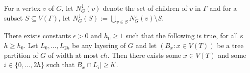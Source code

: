 \documentclass{patmorin}
\begin{document}
For a vertex $v$ of $G$, let $N^\downarrow_{G}(v)$ denote the set of children of $v$ in $\Gamma$ and for a subset $S\subseteq V(\Gamma)$, let $N^\downarrow_G(S):=\bigcup_{v\in S}N^\downarrow_G(v)\setminus S$.






\begin{lem}
  There exists constants $\epsilon >0$ and $h_0\ge 1$ such that the following is true, for all s $h \ge h_0$.  Let $L_0,\ldots,L_{2h}$ be any layering of $G$ and let $(B_x:x\in V(T))$ be a tree partition of $G$ of width at most $ch$.  Then there exists some $x\in V(T)$ and some $i\in\{0,\ldots,2h\}$ such that $B_x\cap L_i| \ge h^{\epsilon}$.
\end{lem}
\end{document}
